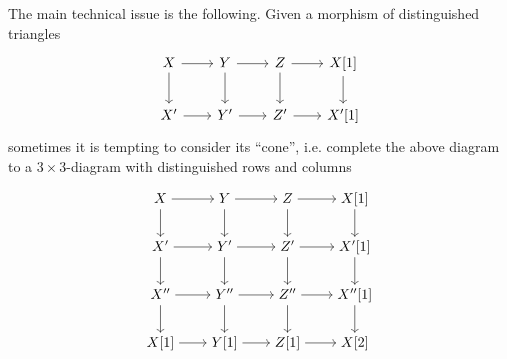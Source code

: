 \begin{remark}
  \label{rmk:issues-with-triangulated-nine-lemma}
  The main technical issue is the following. Given a morphism of distinguished
  triangles
  \begin{equation}
    \label{eqn:middling-good-morphism-of-triangles}
    \begin{tikzcd}[row sep=2em, column sep=2em]
      X \ar{r}\ar{d} & Y \ar{r}\ar{d} & Z \ar{r}\ar{d} & X [1]\ar{d} \\
      X' \ar{r} & Y' \ar{r} & Z' \ar{r} & X' [1]
    \end{tikzcd}
  \end{equation}
  sometimes it is tempting to consider its ``cone'', i.e. complete the above
  diagram to a $3\times 3$-diagram with distinguished rows and columns
  \[ \begin{tikzpicture}
      \matrix(m)[matrix of math nodes, row sep=2em, column sep=2em, text height=1.5ex, text depth=0.25ex]{
        X & Y & Z & X[1] \\
        X' & Y' & Z' & X'[1] \\
        X'' & Y'' & Z'' & X''[1] \\
        X[1]  & Y[1]  & Z[1]  & X[2]\\};

      \path[->] (m-1-1) edge (m-1-2);
      \path[->] (m-1-2) edge (m-1-3);
      \path[->] (m-1-3) edge (m-1-4);

      \path[->] (m-2-1) edge (m-2-2);
      \path[->] (m-2-2) edge (m-2-3);
      \path[->] (m-2-3) edge (m-2-4);

      \path[->] (m-3-1) edge (m-3-2);
      \path[->] (m-3-2) edge (m-3-3);
      \path[->] (m-3-3) edge (m-3-4);

      \path[->] (m-4-1) edge (m-4-2);
      \path[->] (m-4-2) edge (m-4-3);
      \path[->] (m-4-3) edge (m-4-4);

      \path[->] (m-1-1) edge (m-2-1);
      \path[->] (m-1-2) edge (m-2-2);
      \path[->] (m-1-3) edge (m-2-3);
      \path[->] (m-1-4) edge (m-2-4);

      \path[->] (m-2-1) edge (m-3-1);
      \path[->] (m-2-2) edge (m-3-2);
      \path[->] (m-2-3) edge (m-3-3);
      \path[->] (m-2-4) edge (m-3-4);

      \path[->] (m-3-1) edge (m-4-1);
      \path[->] (m-3-2) edge (m-4-2);
      \path[->] (m-3-3) edge (m-4-3);
      \path[->] (m-3-4) edge (m-4-4);


\end{tikzpicture}\]
\end{remark}
